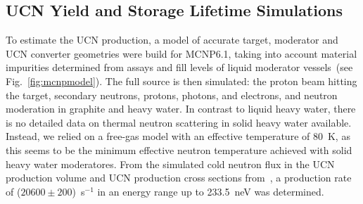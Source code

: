

\subsection{UCN Yield and Storage Lifetime Simulations}
To estimate the UCN production, a model of accurate target, moderator
and UCN converter geometries were build for MCNP6.1, taking into
account material impurities determined from assays and fill levels of
liquid moderator vessels~(see Fig.~\ref{fig:mcnpmodel}). The full
source is then simulated: the proton beam hitting the target,
secondary neutrons, protons, photons, and electrons, and neutron
moderation in graphite and heavy water. In contrast to liquid heavy
water, there is no detailed data on thermal neutron scattering in
solid heavy water available. Instead, we relied on a free-gas model
with an effective temperature of 80~K, as this seems to be the minimum
effective neutron temperature achieved with solid heavy water
moderatores.  From the simulated cold neutron flux in the UCN
production volume and UCN production cross sections
from~\cite{Schmidt2015,Korobkina2002}, a production rate of
($20600\pm 200$)~s$^{-1}$ in an energy range up to 233.5~neV was
determined.

